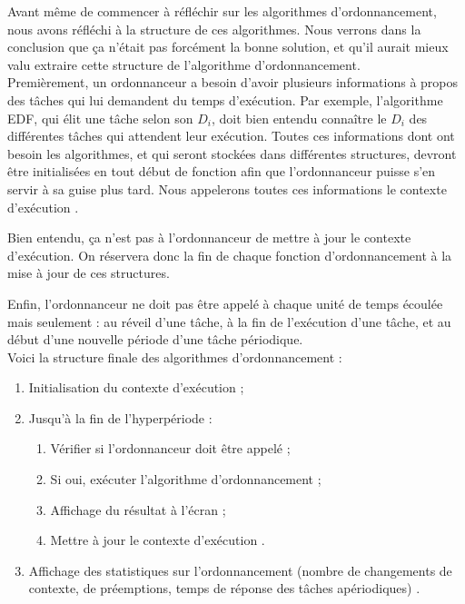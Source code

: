 		Avant même de commencer à réfléchir sur les algorithmes d'ordonnancement, nous avons réfléchi à la structure de ces algorithmes. Nous verrons dans la conclusion que ça n'était pas forcément la bonne solution, et qu'il aurait mieux valu extraire cette structure de l'algorithme d'ordonnancement.\\
		
		Premièrement, un ordonnanceur a besoin d'avoir plusieurs informations à propos des tâches qui lui demandent du temps d'exécution. Par exemple, l'algorithme EDF, qui élit une tâche selon son $D_i$, doit bien entendu connaître le $D_i$ des différentes tâches qui attendent leur exécution. Toutes ces informations dont ont besoin les algorithmes, et qui seront stockées dans différentes structures, devront être initialisées en tout début de fonction afin que l'ordonnanceur puisse s'en servir à sa guise plus tard. Nous appelerons toutes ces informations le \og contexte d'exécution \fg.
		
		Bien entendu, ça n'est pas à l'ordonnanceur de mettre à jour le contexte d'exécution. On réservera donc la fin de chaque fonction d'ordonnancement à la mise à jour de ces structures.
		
		Enfin, l'ordonnanceur ne doit pas être appelé à chaque unité de temps écoulée mais seulement : au réveil d'une tâche, à la fin de l'exécution d'une tâche, et au début d'une nouvelle période d'une tâche périodique.\\
		
		Voici la structure finale des algorithmes d'ordonnancement :
		\begin{enumerate}
			\item Initialisation du contexte d'exécution ;
			\item Jusqu'à la fin de l'hyperpériode :
			\begin{enumerate}
				\item Vérifier si l'ordonnanceur doit être appelé ;
				\item Si oui, exécuter l'algorithme d'ordonnancement ;
				\item Affichage du résultat à l'écran ;
				\item Mettre à jour le contexte d'exécution .
			\end{enumerate}
			\item Affichage des statistiques sur l'ordonnancement (nombre de changements de contexte, de préemptions, temps de réponse des tâches apériodiques) .
		\end{enumerate}
		
